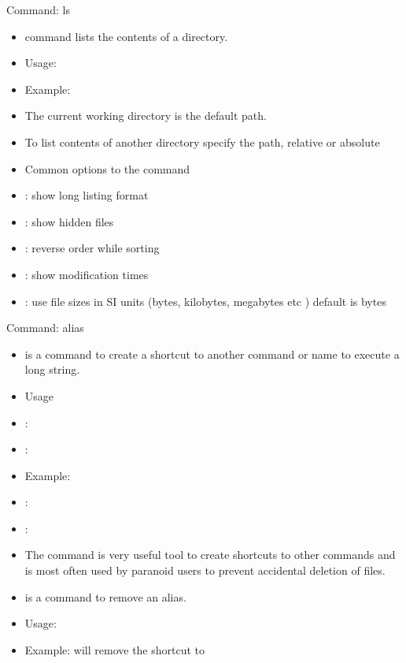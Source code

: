 \documentclass[10pt,t]{beamer}
\begin{document}
\begin{frame}[fragile]{Command: ls}
  \begin{itemize}
    \item {} command lists the contents of a directory.
    \item Usage: 
    \item Example: 
    \item The current working directory is the default path.
    \item To list contents of another directory specify the path, relative or absolute
    \item Common options to the  command 
    \item[] : show long listing format
    \item[] : show hidden files
    \item[] : reverse order while sorting
    \item[] : show modification times
    \item[] : use file sizes in SI units (bytes, kilobytes, megabytes etc ) default is bytes
  \end{itemize}
\end{frame}

\begin{frame}[fragile]{Command: alias}
  \begin{itemize}
    \item {} is a command to create a shortcut to another command or name to execute a long string.
    \item Usage 
    \item[] : 
    \item[] : 
    \item Example: 
    \item[] : 
    \item[] : 
    \item The  command is very useful tool to create shortcuts to other commands and is most often used by paranoid users to prevent accidental deletion of files. 
    \item {} is a command to remove an alias.
    \item Usage: 
    \item Example:  will remove the shortcut to 
  \end{itemize}
\end{frame}
\end{document}
